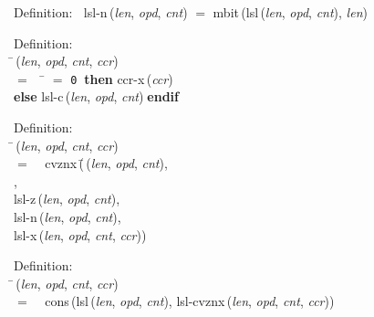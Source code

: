 \begin{tabbing}{\sc Definition}:$\;\;$
{\rm{lsl-n}}\,({\it{len\/}}, {\it{opd\/}}, {\it{cnt\/}}) $=$ {\rm{mbit}}\,({\rm{lsl}}\,({\it{len\/}}, {\it{opd\/}}, {\it{cnt\/}}), {\it{len\/}})
\end{tabbing}

\begin{tabbing}{\sc Definition}: \\  
\=\,({\it{len\/}}, {\it{opd\/}}, {\it{cnt\/}}, {\it{ccr\/}}) \\ 
$=$$\;\;\;\;$\= $=$ {\tt{0}}$\;\;${\bf then }{\rm{ccr-x}}\,({\it{ccr\/}}) \\ 
{\bf else }{\rm{lsl-c}}\,({\it{len\/}}, {\it{opd\/}}, {\it{cnt\/}})$\;${\bf  endif}\-\-
\end{tabbing}

\begin{tabbing}{\sc Definition}: \\  
\=\,({\it{len\/}}, {\it{opd\/}}, {\it{cnt\/}}, {\it{ccr\/}}) \\ 
$=$$\;\;\;\;${\rm{cvznx}}\,(\=\,({\it{len\/}}, {\it{opd\/}}, {\it{cnt\/}}), \\ 
{}, \\ 
{\rm{lsl-z}}\,({\it{len\/}}, {\it{opd\/}}, {\it{cnt\/}}), \\ 
{\rm{lsl-n}}\,({\it{len\/}}, {\it{opd\/}}, {\it{cnt\/}}), \\ 
{\rm{lsl-x}}\,({\it{len\/}}, {\it{opd\/}}, {\it{cnt\/}}, {\it{ccr\/}}))\-\-
\end{tabbing}

\begin{tabbing}{\sc Definition}: \\  
\=\,({\it{len\/}}, {\it{opd\/}}, {\it{cnt\/}}, {\it{ccr\/}}) \\ 
$=$$\;\;\;\;${\rm{cons}}\,({\rm{lsl}}\,({\it{len\/}}, {\it{opd\/}}, {\it{cnt\/}}), {\rm{lsl-cvznx}}\,({\it{len\/}}, {\it{opd\/}}, {\it{cnt\/}}, {\it{ccr\/}}))\-
\end{tabbing}

